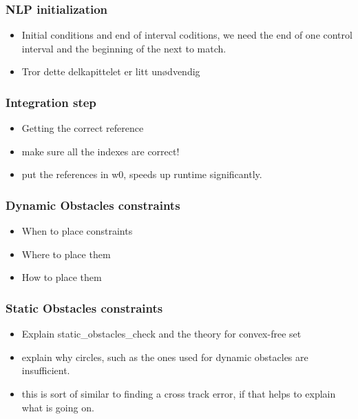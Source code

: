 \subsubsection{NLP initialization}
\begin{itemize}
    \item Initial conditions and end of interval coditions, we need the end of one control interval and the beginning of the next to match.
    \item Tror dette delkapittelet er litt unødvendig
\end{itemize}

\subsubsection{Integration step}
\begin{itemize}
    \item Getting the correct reference
    \item make sure all the indexes are correct!
    \item put the references in w0, speeds up runtime significantly.
\end{itemize}

\subsubsection{Dynamic Obstacles constraints}
\begin{itemize}
    \item When to place constraints
    \item Where to place them
    \item How to place them
\end{itemize}

\subsubsection{Static Obstacles constraints}
\begin{itemize}
    \item Explain static\_obstacles\_check and the theory for convex-free set
    \item explain why circles, such as the ones used for dynamic obstacles are insufficient.
    \item this is sort of similar to finding a cross track error, if that helps to explain what is going on.
\end{itemize}

